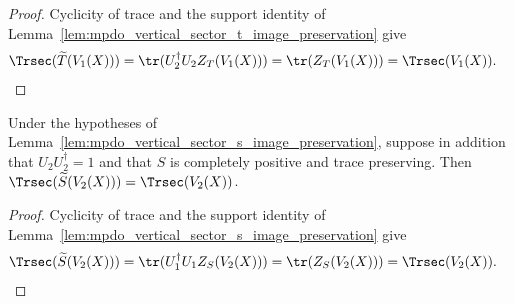 \begin{proof}\leanok
    Cyclicity of trace and the support identity of
    Lemma~\ref{lem:mpdo_vertical_sector_t_image_preservation} give
    \begin{align}
        \Trsec(\widetilde T(V_1(X)))
         & =\tr(U_2^\dagger U_2Z_T(V_1(X)))
        =\tr(Z_T(V_1(X)))
        =\Trsec(V_1(X)).
        \notag
    \end{align}
\end{proof}

\begin{lemma}
    \label{lem:mpdo_vertical_sector_s_source_generated_trace}
    \leanok
    Under the hypotheses of
    Lemma~\ref{lem:mpdo_vertical_sector_s_image_preservation}, suppose in
    addition that $U_2U_2^\dagger=1$ and that $S$ is completely positive and
    trace preserving. Then
    $\Trsec(\widetilde S(V_2(X)))=\Trsec(V_2(X))$.
\end{lemma}

\begin{proof}\leanok
    Cyclicity of trace and the support identity of
    Lemma~\ref{lem:mpdo_vertical_sector_s_image_preservation} give
    \begin{align}
        \Trsec(\widetilde S(V_2(X)))
         & =\tr(U_1^\dagger U_1Z_S(V_2(X)))
        =\tr(Z_S(V_2(X)))
        =\Trsec(V_2(X)).
        \notag
    \end{align}
\end{proof}

